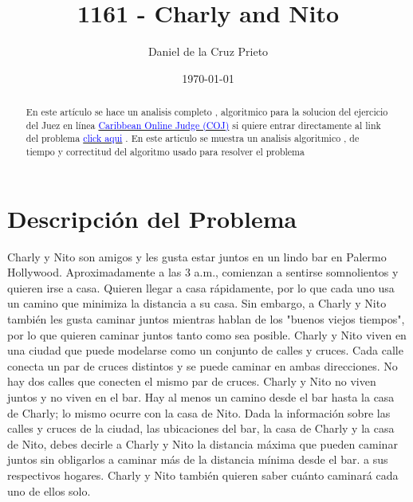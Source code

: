 \documentclass[10pt]{article}
\begin{document}
    \title{1161 - Charly and Nito} 
    \author{Daniel de la Cruz Prieto} 
    \date{\today} 
    \maketitle
    

    \begin{abstract}
        \noindent En este art\'iculo se hace un analisis completo , 
        algoritmico para la solucion del ejercicio del Juez en 
        l\'inea \href{https://coj.uci.cu}{\textcolor{blue}{Caribbean Online Judge (COJ)}} 
        si quiere entrar directamente al link del problema 
        \href{https://coj.uci.cu/24h/problem.xhtml?pid=1161}{\textcolor{blue}{click aqui}} 
        . En este articulo se muestra un analisis algoritmico , de tiempo y correctitud del 
        algoritmo usado para resolver el problema 
    \end{abstract}


    \section*{Descripci\'on del Problema } 

    \begin{flushleft}
    Charly y Nito son amigos y les gusta estar juntos en un lindo bar en 
    Palermo Hollywood. Aproximadamente a las 3 a.m., comienzan a
    sentirse somnolientos y quieren irse a casa.
    Quieren llegar a casa r\'apidamente, por lo que cada uno usa 
    un camino que minimiza la distancia a su casa. Sin embargo,
    a Charly y Nito también les gusta caminar juntos mientras 
    hablan de los "buenos viejos tiempos", por lo que quieren 
    caminar juntos tanto como sea posible. Charly y Nito viven 
    en una ciudad que puede modelarse como un conjunto de 
    calles y cruces. Cada calle conecta un par de cruces 
    distintos y se puede caminar en ambas direcciones. 
    No hay dos calles que conecten el mismo par de cruces. 
    Charly y Nito no viven juntos y no viven en el bar. 
    Hay al menos un camino desde el bar hasta la casa de Charly; 
    lo mismo ocurre con la casa de Nito. 
    Dada la información sobre las calles y cruces de la ciudad, 
    las ubicaciones del bar, la casa de Charly y la casa de Nito,
    debes decirle a Charly y Nito la distancia m\'axima que pueden 
    caminar juntos sin obligarlos a caminar m\'as de la 
    distancia m\'inima desde el bar. a sus respectivos hogares.
    Charly y Nito tambi\'en quieren saber cu\'anto caminar\'a 
    cada uno de ellos solo.
    \end{flushleft}
\end{document}
